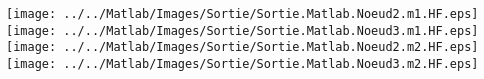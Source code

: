 \documentclass[varwidth,convert]{standalone}
\begin{document}
\texttt{[image: ../../Matlab/Images/Sortie/Sortie.Matlab.Noeud2.m1.HF.eps]}
\texttt{[image: ../../Matlab/Images/Sortie/Sortie.Matlab.Noeud3.m1.HF.eps]}
\newline
\texttt{[image: ../../Matlab/Images/Sortie/Sortie.Matlab.Noeud2.m2.HF.eps]}
\texttt{[image: ../../Matlab/Images/Sortie/Sortie.Matlab.Noeud3.m2.HF.eps]}
\end{document}
